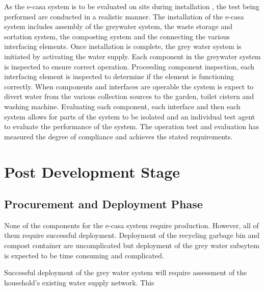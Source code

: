 \documentclass[a4paper,11pt,fleqn]{report}
\begin{document}
As the e-casa system is to be evaluated on site during installation , the test being performed are conducted in a realistic manner. The installation of the e-casa system includes assembly of the greywater system, the waste storage and sortation system, the composting system and the connecting the various interfacing elements. Once installation is complete, the grey water system is initiated by activating the water supply. Each component in the greywater system is inspected to ensure correct operation. Proceeding component inspection, each interfacing element is inspected to determine if the element is functioning correctly. When components and interfaces are operable the system is expect to divert water from the various collection sources to the garden, toilet cistern and washing machine. Evaluating each component, each interface and then each system allows for parts of the system to be isolated and an individual test agent to evaluate the performance of the system. The operation test and evaluation has measured the degree of compliance and achieves the stated requirements.

\chapter{Post Development Stage}

\section{Procurement and Deployment Phase}
None of the components for the \ac{e-casa} system require production. However, all of them require successful deployment. Deployment of the recycling garbage bin and compost container are uncomplicated but deployment of the grey water subsytem is expected to be time consuming and complicated. 

Successful deployment of the grey water system will require assessment of the household's existing water supply network. This 
\end{document}
